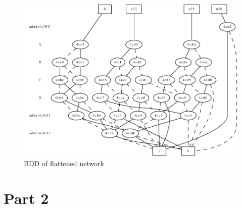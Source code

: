 \documentclass{article}
\begin{document}
    \begin{figure}[h]
        \begin{minipage}{0.99\textwidth}
        \centering
        \includegraphics[width=.9\textwidth]{img/bdd.png}
        \caption{BDD of flattened network}
        \label{fig:bdd}
        \end{minipage}
    \end{figure}

    \newpage

    \section{Part 2}
\end{document}
